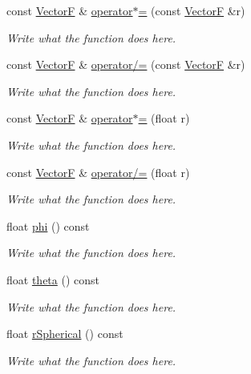 \begin{DoxyCompactItemize}
const \hyperlink{structVectorF}{Vector\+F} \& \hyperlink{structVectorF_a88cf7042eb14233563d3019f2398bd32}{operator$\ast$=} (const \hyperlink{structVectorF}{Vector\+F} \&r)
\begin{DoxyCompactList}\small\item\em Write what the function does here. \end{DoxyCompactList}\item 
const \hyperlink{structVectorF}{Vector\+F} \& \hyperlink{structVectorF_af23ffd3fd18b6dde2eea6fdb17ad38af}{operator/=} (const \hyperlink{structVectorF}{Vector\+F} \&r)
\begin{DoxyCompactList}\small\item\em Write what the function does here. \end{DoxyCompactList}\item 
const \hyperlink{structVectorF}{Vector\+F} \& \hyperlink{structVectorF_a7eefa6afb0423e0d73b9f44a29941149}{operator$\ast$=} (float r)
\begin{DoxyCompactList}\small\item\em Write what the function does here. \end{DoxyCompactList}\item 
const \hyperlink{structVectorF}{Vector\+F} \& \hyperlink{structVectorF_ae7f9ffcce8e70e05d1f9608425e6a73c}{operator/=} (float r)
\begin{DoxyCompactList}\small\item\em Write what the function does here. \end{DoxyCompactList}\item 
float \hyperlink{structVectorF_a06ad6731ddd2591b29581f25eed20737}{phi} () const 
\begin{DoxyCompactList}\small\item\em Write what the function does here. \end{DoxyCompactList}\item 
float \hyperlink{structVectorF_a057b3c771f25463a76c1c9bc9425e663}{theta} () const 
\begin{DoxyCompactList}\small\item\em Write what the function does here. \end{DoxyCompactList}\item 
float \hyperlink{structVectorF_aabadea23e2330189a4fb35077c849b60}{r\+Spherical} () const 
\begin{DoxyCompactList}\small\item\em Write what the function does here. \end{DoxyCompactList}\end{DoxyCompactItemize}
